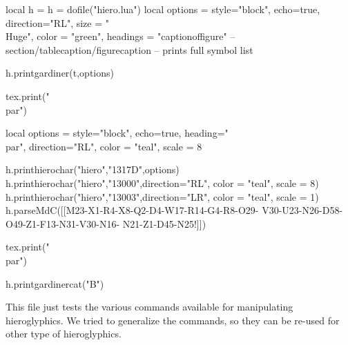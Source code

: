 \begin{luacode*}
    local h = {}
          h = dofile("hiero.lua")
    local options = {style="block",
                     echo=true,
                     direction="RL",
                     size = "\\Huge",
                     color = "green",
                     headings = "captionof{figure}"  -- section/tablecaption/figurecaption
                     }
   -- prints full symbol list
   
   h.printgardiner(t,options)

   tex.print("\\par")
   
   local options = {style="block",
                     echo=true,
                     heading="\\par",
                     direction="RL",
                     color = "teal",
                     scale = 8}

   h.printhierochar("hiero","1317D",options)
   h.printhierochar("hiero","13000",{direction="RL",
                                        color = "teal",
                                        scale = 8})
   h.printhierochar("hiero","13003",{direction="LR",
                                        color = "teal",
                                        scale = 1})
   h.parseMdC([[M23-X1-R4-X8-Q2-D4-W17-R14-G4-R8-O29-
               V30-U23-N26-D58-O49-Z1-F13-N31-V30-N16-
               N21-Z1-D45-N25!]])

   tex.print("\\par")
   
   h.printgardinercat("B")

\end{luacode*}

\newcommand\hierochar[2][direction = "LR",
                         color     = "teal",
                         scale     = 1]{%
               \luaexec{
                h = h or {}
                h = require("hiero.lua")  
                h.parseMdC(#2,{#1})}}
               
\newcommand\printhierochar[3][direction = "LR",
                              color     = "teal",
                              scale     = 4]{%
               \luaexec{
                h = h or {}
                h = require("hiero.lua")  
                h.printhierochar(#2,#3,{#1})}}

This file just tests the various commands available for manipulating hieroglyphics. We tried to 
generalize the commands, so they can be re-used for other type of hieroglyphics.

